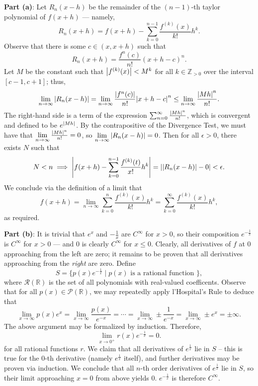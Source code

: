 \documentclass[11pt]{article}
\begin{document}
\textbf{Part (a)}: Let $R_{n}(x - h)$ be the remainder of the $(n - 1)$-th taylor polynomial of $f(x + h)$ --- namely,
\[
	R_{n}(x + h) = f(x + h) - \sum_{k = 0}^{n - 1} \frac{f^{(k)}(x)}{k!} h^{k}.
\]
Observe that there is some $c \in (x, x + h)$ such that
\[
	R_{n}(x + h) = \frac{f^{n}(c)}{n!}(x + h - c)^{n}.
\]
Let $M$ be the constant such that $\abs{f^{(k)}(x)} < M^{k}$ for all $k \in \mathbb{Z}_{> 0}$ over the interval $[c - 1, c + 1]$; thus,
\[
	\lim\limits_{n \to \infty} \abs{R_{n}(x - h)} = \lim\limits_{n \to \infty} \frac{\abs{f^{n}(c)}}{n!}\abs{x + h - c}^{n} \le \lim\limits_{n \to \infty} \frac{\abs{Mh}^{n}}{n!}.
\]
The right-hand side is a term of the expression $\sum_{n = 0}^{\infty} \frac{\abs{Mh}^{n}}{n!}$, which is convergent and defined to be $e^{\abs{Mh}}$. By the contrapositive of the Divergence Test, we must have that $\lim\limits_{n \to \infty} \frac{\abs{Mh}^{n}}{n!} = 0$, so $\lim\limits_{n \to \infty} \abs{R_{n}(x - h)} = 0$. Then for all $\epsilon > 0$, there exists $N$ such that 
\[
	N < n \implies \abs{f(x + h) - \sum_{k = 0}^{n - 1} \frac{f^{(k)}(t)}{x!} h^{k}} = \abs{\abs{R_{n}(x - h)} - 0} < \epsilon.
\]
We conclude via the definition of a limit that
\[
	f(x + h) = \lim\limits_{n \to \infty} \sum_{k = 0}^{n} \frac{f^{(k)}(x)}{k!} h^{k} = \sum_{k = 0}^{\infty} \frac{f^{(k)}(x)}{k!} h^{k},
\]
as required.

\textbf{Part (b)}: It is trivial that $e^{x}$ and $-\tfrac{1}{x}$ are $C^{\infty}$ for $x > 0$, so their composition $e^{-\frac{1}{x}}$ is $C^{\infty}$ for $x > 0$ --- and $0$ is clearly $C^{\infty}$ for $x \le 0$. Clearly, all derivatives of $f$ at $0$ approaching from the left are zero; it remains to be proven that all derivatives approaching from the \textit{right} are zero. Define
\[
	S = \{ p \left( x \right) e^{-\tfrac{1}{x}} \mid p(x) \text{ is a rational function }\},
\]
where $\mathcal{R}(\mathbb{R})$ is the set of all polynomials with real-valued coefficents. Observe that for all $p(x) \in \mathcal{P(\mathbb{R})}$, we may repeatedly apply l'Hospital's Rule to deduce that
\[
	\lim\limits_{x \to \infty} p(x) e^{x} = \lim\limits_{x \to \infty} \frac{p(x)}{e^{-x}} = \cdots = \lim\limits_{x \to \infty} \pm \frac{1}{e^{-x}} = \lim\limits_{x \to \infty} \pm e^{x} = \pm \infty.
\]
The above argument may be formalized by induction. Therefore,
\[
	\lim\limits_{x \to 0^{+}} r \left( x \right) e^{-\tfrac{1}{x}} = 0.
\]
for all rational functions $r$. We claim that all derivatives of $e^{\tfrac{1}{x}}$ lie in $S$ -- this is true for the $0$-th derivative (namely $e^{\tfrac{1}{x}}$ itself), and further derivatives may be proven via induction. We conclude that all $n$-th order derivatives of $e^{\tfrac{1}{x}}$ lie in $S$, so their limit approaching $x = 0$ from above yields $0$. $e^{-\tfrac{1}{x}}$ is therefore $C^{\infty}$.
\end{document}
